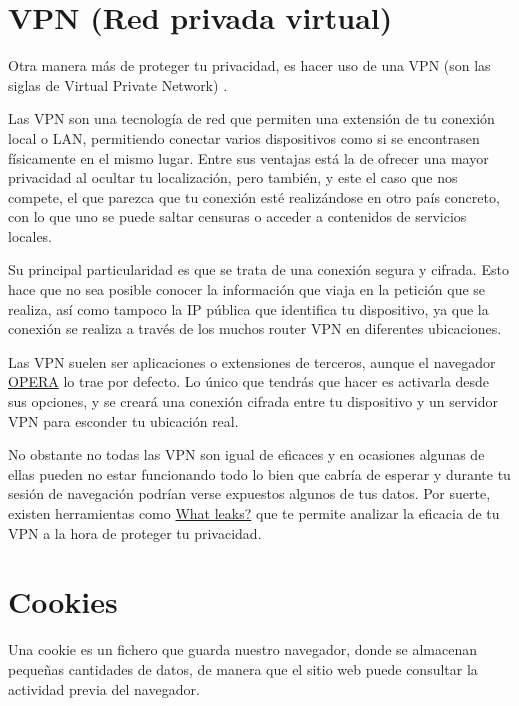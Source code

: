 \documentclass[
  spanish,
  a4paper,
  openany]{book}
\begin{document}
\hypertarget{vpn-red-privada-virtual}{%
\section{VPN (Red privada virtual)}\label{vpn-red-privada-virtual}}

Otra manera más de proteger tu privacidad, es hacer uso de una VPN (son las siglas de Virtual Private Network) \citep{AVAST-vpn}.

Las VPN son una tecnología de red que permiten una extensión de tu conexión local o LAN, permitiendo conectar varios dispositivos como si se encontrasen físicamente en el mismo lugar. Entre sus ventajas está la de ofrecer una mayor privacidad al ocultar tu localización, pero también, y este el caso que nos compete, el que parezca que tu conexión esté realizándose en otro país concreto, con lo que uno se puede saltar censuras o acceder a contenidos de servicios locales.

Su principal particularidad es que se trata de una conexión segura y cifrada. Esto hace que no sea posible conocer la información que viaja en la petición que se realiza, así como tampoco la IP pública que identifica tu dispositivo, ya que la conexión se realiza a través de los muchos router VPN en diferentes ubicaciones.

Las VPN suelen ser aplicaciones o extensiones de terceros, aunque el navegador \href{https://www.opera.com/es}{OPERA} lo trae por defecto. Lo único que tendrás que hacer es activarla desde sus opciones, y se creará una conexión cifrada entre tu dispositivo y un servidor VPN para esconder tu ubicación real.

No obstante no todas las VPN son igual de eficaces y en ocasiones algunas de ellas pueden no estar funcionando todo lo bien que cabría de esperar y durante tu sesión de navegación podrían verse expuestos algunos de tus datos. Por suerte, existen herramientas como \href{https://whatleaks.com/}{What leaks?} que te permite analizar la eficacia de tu VPN a la hora de proteger tu privacidad.

\hypertarget{cookies}{%
\section{Cookies}\label{cookies}}

Una cookie es un fichero que guarda nuestro navegador, donde se almacenan pequeñas cantidades de datos, de manera que el sitio web puede consultar la actividad previa del navegador.
\end{document}
